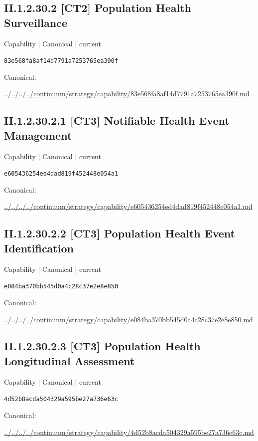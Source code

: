 \documentclass[10pt,a4paper]{article}
\begin{document}
\subsection*{II.1.2.30.2 [CT2] Population Health Surveillance}
{\small Capability | Canonical | current}\par
\texttt{83e568fa8af14d7791a7253765ea390f}\par
Canonical: \par
{\footnotesize\url{../../../../continuum/strategy/capability/83e568fa8af14d7791a7253765ea390f.md}}\par
\subsection*{II.1.2.30.2.1 [CT3] Notifiable Health Event Management}
{\small Capability | Canonical | current}\par
\texttt{e605436254ed4dad819f452448e054a1}\par
Canonical: \par
{\footnotesize\url{../../../../continuum/strategy/capability/e605436254ed4dad819f452448e054a1.md}}\par
\subsection*{II.1.2.30.2.2 [CT3] Population Health Event Identification}
{\small Capability | Canonical | current}\par
\texttt{e084ba370bb545d0a4c28c37e2e8e850}\par
Canonical: \par
{\footnotesize\url{../../../../continuum/strategy/capability/e084ba370bb545d0a4c28c37e2e8e850.md}}\par
\subsection*{II.1.2.30.2.3 [CT3] Population Health Longitudinal Assessment}
{\small Capability | Canonical | current}\par
\texttt{4d52b8acda504329a595be27a736e63c}\par
Canonical: \par
{\footnotesize\url{../../../../continuum/strategy/capability/4d52b8acda504329a595be27a736e63c.md}}\par
\end{document}
